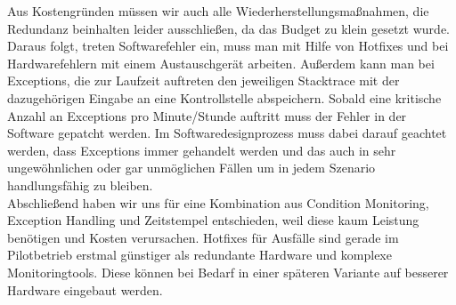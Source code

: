 Aus Kostengründen müssen wir auch alle Wiederherstellungsmaßnahmen, die Redundanz beinhalten leider ausschließen, da das Budget zu klein gesetzt wurde. Daraus folgt, treten Softwarefehler ein, muss man mit Hilfe von Hotfixes und bei Hardwarefehlern mit einem Austauschgerät arbeiten. Außerdem kann man bei Exceptions, die zur Laufzeit auftreten den jeweiligen Stacktrace mit der dazugehörigen Eingabe an eine Kontrollstelle abspeichern. Sobald eine kritische Anzahl an Exceptions pro Minute/Stunde auftritt muss der Fehler in der Software gepatcht werden. Im Softwaredesignprozess muss dabei darauf geachtet werden, dass Exceptions immer gehandelt werden und das auch in sehr ungewöhnlichen oder gar unmöglichen Fällen um in jedem Szenario handlungsfähig zu bleiben.
\\
Abschließend haben wir uns für eine Kombination aus Condition Monitoring, Exception Handling und Zeitstempel entschieden, weil diese kaum Leistung benötigen und Kosten verursachen. Hotfixes für Ausfälle sind gerade im Pilotbetrieb erstmal günstiger als redundante Hardware und komplexe Monitoringtools. Diese können bei Bedarf in einer späteren Variante auf besserer Hardware eingebaut werden.
